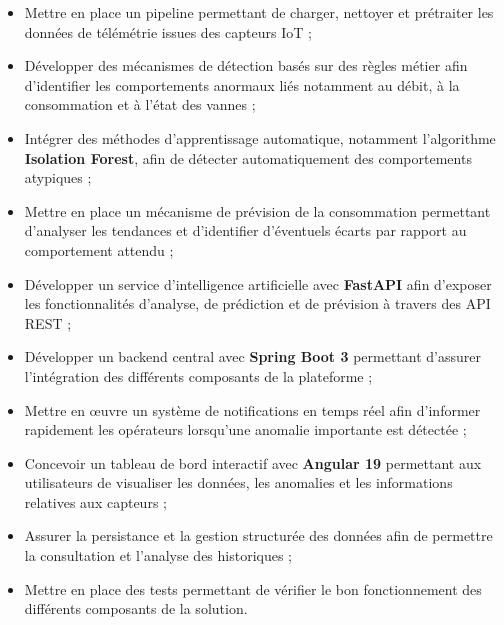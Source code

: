 \begin{itemize}

    \item Mettre en place un pipeline permettant de charger, nettoyer et
    prétraiter les données de télémétrie issues des capteurs IoT ;

    \item Développer des mécanismes de détection basés sur des règles métier
    afin d'identifier les comportements anormaux liés notamment au débit,
    à la consommation et à l'état des vannes ;

    \item Intégrer des méthodes d'apprentissage automatique, notamment
    l'algorithme \textbf{Isolation Forest}, afin de détecter automatiquement
    des comportements atypiques ;

    \item Mettre en place un mécanisme de prévision de la consommation
    permettant d'analyser les tendances et d'identifier d'éventuels écarts
    par rapport au comportement attendu ;

    \item Développer un service d'intelligence artificielle avec
    \textbf{FastAPI} afin d'exposer les fonctionnalités d'analyse,
    de prédiction et de prévision à travers des API REST ;

    \item Développer un backend central avec \textbf{Spring Boot 3}
    permettant d'assurer l'intégration des différents composants de la
    plateforme ;

    \item Mettre en œuvre un système de notifications en temps réel afin
    d'informer rapidement les opérateurs lorsqu'une anomalie importante
    est détectée ;

    \item Concevoir un tableau de bord interactif avec
    \textbf{Angular 19} permettant aux utilisateurs de visualiser les
    données, les anomalies et les informations relatives aux capteurs ;

    \item Assurer la persistance et la gestion structurée des données afin
    de permettre la consultation et l'analyse des historiques ;

    \item Mettre en place des tests permettant de vérifier le bon
    fonctionnement des différents composants de la solution.

\end{itemize}

